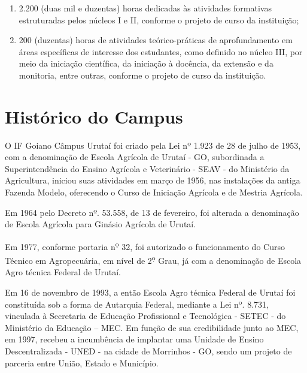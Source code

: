 \begin{itemize}[label=-]
{\begin{minipage}[t]{10cm}
\begin{enumerate}[label=\alph*.]
        supervisionado, na área de formação e atuação na educação
        básica, contemplando também outras áreas específicas, se for o
        caso, conforme o projeto de curso da instituição;
      \item 2.200 (duas mil e duzentas) horas dedicadas às atividades
        formativas estruturadas pelos núcleos I e II, conforme o
        projeto de curso da instituição;
      \item 200 (duzentas) horas de atividades teórico-práticas de
        aprofundamento em áreas específicas de interesse dos
        estudantes, como definido no núcleo III, por meio da iniciação
        científica, da iniciação à docência, da extensão e da
        monitoria, entre outras, conforme o projeto de curso da
        instituição.
      \end{enumerate}
    \end{minipage}
  }
\end{itemize}

\section{Hist\'{o}rico do Campus}
\label{sec:hist-cmpurt}

O IF Goiano Câmpus Urutaí foi criado pela Lei nº 1.923 de 28 de julho
de 1953, com a denominação de Escola Agrícola de Urutaí - GO,
subordinada a Superintendência do Ensino Agrícola e Veterinário - SEAV
- do Ministério da Agricultura, iniciou suas atividades em março de
1956, nas instalações da antiga Fazenda Modelo, oferecendo o Curso de
Iniciação Agrícola e de Mestria Agrícola.

Em 1964 pelo Decreto nº. 53.558, de 13 de fevereiro, foi alterada a
denominação de Escola Agrícola para Ginásio Agrícola de Urutaí.

Em 1977, conforme portaria n\textsuperscript{\d o} 32, foi autorizado
o funcionamento do Curso Técnico em Agropecuária, em nível de
2\textsuperscript{\d o} Grau, já com a denominação de Escola Agro
técnica Federal de Urutaí.

Em 16 de novembro de 1993, a então Escola Agro técnica Federal de
Urutaí foi constituída sob a forma de Autarquia Federal, mediante a
Lei nº. 8.731, vinculada à Secretaria de Educação Profissional e
Tecnológica - SETEC - do Ministério da Educação – MEC.  Em função de
sua credibilidade junto ao MEC, em 1997, recebeu a incumbência de
implantar uma Unidade de Ensino Descentralizada - UNED - na cidade de
Morrinhos - GO, sendo um projeto de parceria entre União, Estado e
Município.

